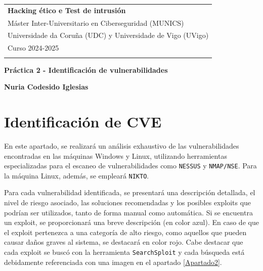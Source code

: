 \documentclass[a4paper,12pt]{article} %
\begin{document}
 \thispagestyle{empty}  

\begin{tabular}{p{15.5cm}}  
{\large \bf Hacking ético e Test de intrusión} \\ Máster Inter-Universitario en Ciberseguridad (MUNICS)  
 \\  Universidade da Coruña (UDC) y Universidade de Vigo (UVigo)\\ Curso 2024-2025  \\
\hline    
\\
\end{tabular}  
\vspace*{0.1cm}  

\begin{center}  
	{\Large \bf Práctica 2 - Identificación de vulnerabilidades
} %
	\vspace{1mm}
	
	{\bf Nuria Codesido Iglesias} %
		
\end{center}  

\vspace{0.4cm}



\renewcommand{\contentsname}{Índice} %
\tableofcontents  %

\newpage
\section{Identificación de CVE}
En este apartado, se realizará un análisis exhaustivo de las vulnerabilidades encontradas en las máquinas Windows y Linux, utilizando herramientas especializadas para el escaneo de vulnerabilidades como \texttt{NESSUS} y \texttt{NMAP/NSE}. Para la máquina Linux, además, se empleará \texttt{NIKTO}.

Para cada vulnerabilidad identificada, se presentará una descripción detallada, el nivel de riesgo asociado, las soluciones recomendadas y los posibles exploits que podrían ser utilizados, tanto de forma manual como automática. Si se encuentra un exploit, se proporcionará una breve descripción (en color azul). En caso de que el exploit pertenezca a una categoría de alto riesgo, como aquellos que pueden causar daños graves al sistema, se destacará en color rojo. Cabe destacar que cada exploit se buscó con la herramienta \texttt{SearchSploit} y cada búsqueda está debidamente referenciada con una imagen en el apartado \ref{Apartado2}.
\end{document}
